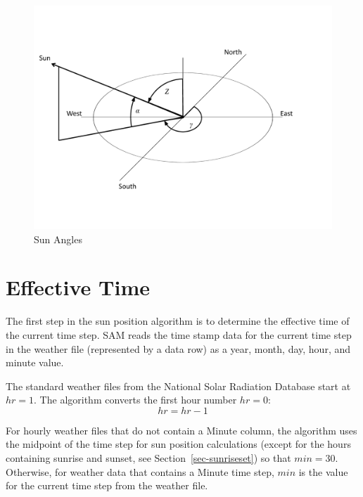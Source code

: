 \documentclass[12pt,letterpaper]{article}
\begin{document}
\begin{figure}
\begin{center}
\includegraphics[scale=0.6]{sun-angles}
\caption{Sun Angles}
\label{fig-sunangles}
\end{center}
\end{figure}

\section{Effective Time}

The first step in the sun position algorithm is to determine the effective time of the current time step. SAM reads the time stamp data for the current time step in the weather file (represented by a data row) as a year, month, day, hour, and minute value. %

The standard weather files from the National Solar Radiation Database \citep{nsrdb} start at $hr=1$. The algorithm converts the first hour number $hr=0$: 
\begin{equation}
hr=hr-1
\end{equation}

For hourly weather files that do not contain a Minute column, the algorithm uses the midpoint of the time step for sun position calculations (except for the hours containing sunrise and sunset, see Section~\ref{sec-sunriseset}) so that $min=30$. Otherwise, for weather data that contains a Minute time step, $min$ is the value for the current time step from the weather file.
\end{document}
